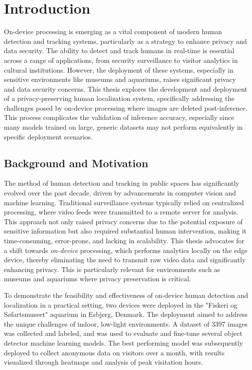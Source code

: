 \section{Introduction}
\label{sec:introduction}
On-device processing is emerging as a vital component of modern human detection and tracking systems, particularly as a strategy to enhance privacy and data security. The ability to detect and track humans in real-time is essential across a range of applications, from security surveillance to visitor analytics in cultural institutions. However, the deployment of these systems, especially in sensitive environments like museums and aquariums, raises significant privacy and data security concerns. This thesis explores the development and deployment of a privacy-preserving human localization system, specifically addressing the challenges posed by on-device processing where images are deleted post-inference. This process complicates the validation of inference accuracy, especially since many models trained on large, generic datasets may not perform equivalently in specific deployment scenarios. 

\subsection{Background and Motivation}
The method of human detection and tracking in public spaces has significantly evolved over the past decade, driven by advancements in computer vision and machine learning. Traditional surveillance systems typically relied on centralized processing, where video feeds were transmitted to a remote server for analysis. This approach not only raised privacy concerns due to the potential exposure of sensitive information but also required substantial human intervention, making it time-consuming, error-prone, and lacking in scalability. This thesis advocates for a shift towards \textit{on-device} processing, which performs analytics locally on the edge device, thereby eliminating the need to transmit raw video data and significantly enhancing privacy. This is particularly relevant for environments such as museums and aquariums where privacy preservation is critical.

To demonstrate the feasibility and effectiveness of on-device human detection and localization in a practical setting, two devices were deployed in the "Fiskeri og Søfartsmuseet" aquarium in Esbjerg, Denmark. The deployment aimed to address the unique challenges of indoor, low-light environments. A dataset of 3397 images was collected and labeled, and was used to evaluate and fine-tune several object detector machine learning models. The best performing model was subsequently deployed to collect anonymous data on visitors over a month, with results visualized through heatmaps and analysis of peak visitation hours.


